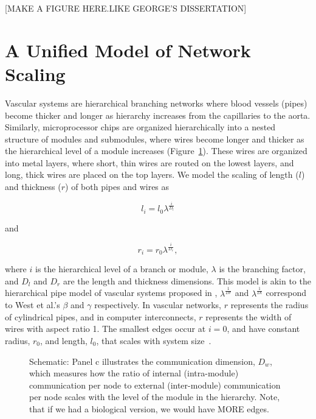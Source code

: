 \documentclass[12pt]{article}
\begin{document}
[MAKE A FIGURE HERE.LIKE GEORGE'S DISSERTATION]

\section{A Unified Model of Network Scaling}
\label{sec:unified-model}


Vascular systems are hierarchical branching networks where blood vessels
(pipes) become thicker and longer as hierarchy increases from the capillaries
to the aorta. Similarly, microprocessor chips are organized hierarchically into
a nested structure of modules and submodules, where wires become longer and
thicker as the hierarchical level of a module increases
(Figure~\ref{fig:model-schematic}).  These wires are organized into metal
layers, where short, thin wires are routed on the lowest layers, and long,
thick wires are placed on the top layers. We model the scaling of length ($l$)
and thickness ($r$) of both pipes and wires as

\begin{equation}
l_i = l_0 \lambda^{\frac{i}{D_l}}
\end{equation}

\noindent and

\begin{equation}
  r_i = r_0 \lambda^{\frac{i}{D_r}},
\label{eq:rscaling}
\end{equation}

\noindent where $i$ is the hierarchical level of a branch or module, $\lambda$
is the branching factor, and $D_l$ and $D_r$ are the length and thickness
dimensions. This model is akin to the hierarchical pipe model of vascular
systems proposed in \cite{west97}, $\lambda^{\frac{1}{Dr}}$ and
$\lambda^{\frac{1}{Dl}}$ correspond to West et al.'s $\beta$ and $\gamma$
respectively.
In vascular networks, $r$ represents the radius of cylindrical pipes, and in
computer interconnects, $r$ represents the width of wires with aspect ratio 1.
The smallest edges occur at $i = 0$, and have constant radius,
$r_0$, and length, $l_0$, that scales with system size~\cite{banavar10}. 

\begin{figure}
\caption{Schematic: Panel c illustrates the communication dimension, $D_w$,
  which measures how the ratio of internal (intra-module) communication per node to
  external (inter-module) communication per node scales with the level of the module in
  the hierarchy. Note, that if we had a biological version, we would
  have MORE edges.}
  \label{fig:model-schematic}
\end{figure}
\end{document}
